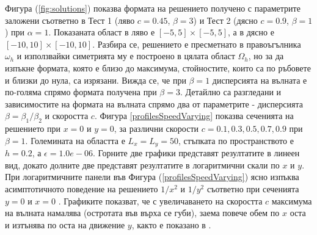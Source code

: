 \documentclass{article}
\newcommand{\rf}[1]{(\ref{#1})}
\begin{document}
Фигура \rf{fig:solutions} показва формата на решението получено с параметрите заложени съответно в Тест 1 (ляво $c=0.45$,  $\beta=3$) и Тест 2 (дясно $c=0.9$,  $\beta=1$) при $\alpha = 1$. Показаната област в ляво е $[-5,5] \times [-5,5]$, а в дясно е $[-10,10] \times [-10,10]$. Разбира се, решението е пресметнато в правоъгълника $\omega_h$ и използвайки симетрията му е построено в цялата област $\Omega_h$, но за да изпъкне формата, която е близо до максимума, стойностите, които са по ръбовете и близки до нула, са изрязани. Вижда се, че при $\beta=1$ дисперсията на вълната е по-голяма спрямо формата получена при $\beta=3$.
Детайлно са разгледани и зависимостите на формата на вълната спрямо два от параметрите - дисперсията $\beta=\beta_1 / \beta_2$ и скоростта $c$.
Фигура \ref{profilesSpeedVarying} показва сеченията на решението при $x=0$ и $y=0$, за различни скорости $c=0.1, 0.3, 0.5, 0.7, 0.9$ при $\beta = 1$. Големината на областта е $L_x = L_y = 50$, стъпката по пространството е $h = 0.2$, а $\epsilon = 1.0e-06$. Горните две графики представят резултатите в линеен вид, докато долните две представят резултатите в логаритмични скали по $x$ и $y$. При логаритмичните панели във Фигура \rf{profilesSpeedVarying} ясно изпъква асимптотичното поведение на решението $1/x^2$ и $1/y^2$ съответно при сеченията $y=0$ и $x=0$ \cite{ref116, ref117}. Графиките показват, че с увеличаването на скоростта $c$ максимума на вълната намалява (остротата във върха се губи), заема повече обем по $x$ оста и изтънява по оста на движение $y$, както е показано в \cite{ref116, ref117}.
\end{document}
